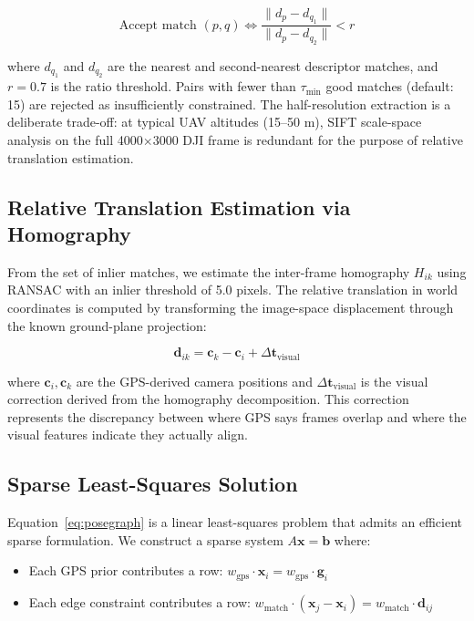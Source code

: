\documentclass[conference]{IEEEtran}
\begin{document}
\begin{equation}
\text{Accept match } (p, q) \iff \frac{\|d_p - d_{q_1}\|}{\|d_p - d_{q_2}\|} < r
\end{equation}

where $d_{q_1}$ and $d_{q_2}$ are the nearest and second-nearest descriptor matches, and $r = 0.7$ is the ratio threshold. Pairs with fewer than $\tau_{\text{min}}$ good matches (default: 15) are rejected as insufficiently constrained. The half-resolution extraction is a deliberate trade-off: at typical UAV altitudes (15--50 m), SIFT scale-space analysis on the full 4000$\times$3000 DJI frame is redundant for the purpose of relative translation estimation.

\subsection{Relative Translation Estimation via Homography}

From the set of inlier matches, we estimate the inter-frame homography $H_{ik}$ using RANSAC with an inlier threshold of 5.0 pixels. The relative translation in world coordinates is computed by transforming the image-space displacement through the known ground-plane projection:

\begin{equation}
\mathbf{d}_{ik} = \mathbf{c}_k - \mathbf{c}_i + \Delta\mathbf{t}_{\text{visual}}
\end{equation}

where $\mathbf{c}_i, \mathbf{c}_k$ are the GPS-derived camera positions and $\Delta\mathbf{t}_{\text{visual}}$ is the visual correction derived from the homography decomposition. This correction represents the discrepancy between where GPS says frames overlap and where the visual features indicate they actually align.

\subsection{Sparse Least-Squares Solution}

Equation~\ref{eq:posegraph} is a linear least-squares problem that admits an efficient sparse formulation. We construct a sparse system $A\mathbf{x} = \mathbf{b}$ where:

\begin{itemize}
    \item Each GPS prior contributes a row: $w_{\text{gps}} \cdot \mathbf{x}_i = w_{\text{gps}} \cdot \mathbf{g}_i$
    \item Each edge constraint contributes a row: $w_{\text{match}} \cdot (\mathbf{x}_j - \mathbf{x}_i) = w_{\text{match}} \cdot \mathbf{d}_{ij}$
\end{itemize}
\end{document}
